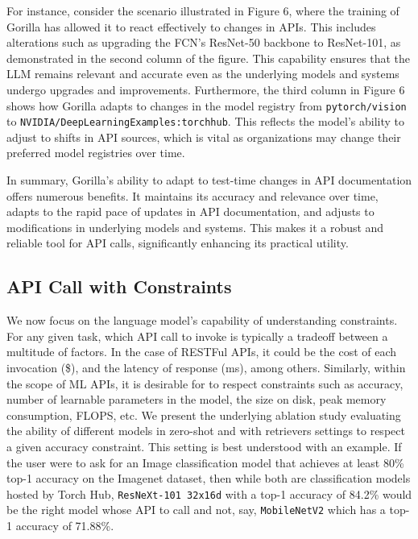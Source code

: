For instance, consider the scenario illustrated in Figure 6, where the training of Gorilla has allowed it to react effectively to changes in APIs. This includes alterations such as upgrading the FCN's ResNet-50 backbone to ResNet-101, as demonstrated in the second column of the figure. This capability ensures that the LLM remains relevant and accurate even as the underlying models and systems undergo upgrades and improvements.
Furthermore, the third column in Figure 6 shows how Gorilla adapts to changes in the model registry from \texttt{pytorch/vision} to \texttt{NVIDIA/DeepLearningExamples:torchhub}. This reflects the model's ability to adjust to shifts in API sources, which is vital as organizations may change their preferred model registries over time.

In summary, Gorilla's ability to adapt to test-time changes in API documentation offers numerous benefits. It maintains its accuracy and relevance over time, adapts to the rapid pace of updates in API documentation, and adjusts to modifications in underlying models and systems. This makes it a robust and reliable tool for API calls, significantly enhancing its practical utility.



\subsection{API Call with Constraints}
We now focus on the language model's capability of understanding constraints. For any given task, which API call to invoke is typically a tradeoff between a multitude of factors. In the case of RESTFul APIs, it could be the cost of each invocation (\$), and the latency of response (ms), among others. Similarly, within the scope of ML APIs, it is desirable for \gorilla{} to respect constraints such as accuracy, number of learnable parameters in the model, the size on disk, peak memory consumption, FLOPS, etc. We present the underlying ablation study evaluating the ability of different models in zero-shot and with retrievers settings to respect a given accuracy constraint. This setting is best understood with an example. If the user were to ask for an Image classification model that achieves at least 80\% top-1 accuracy on the Imagenet dataset, then while both are classification models hosted by Torch Hub,    \texttt{ResNeXt-101 32x16d} with a top-1 accuracy of 84.2\% would be the right model whose API to call and not, say, \texttt{MobileNetV2} which has a top-1 accuracy of 71.88\%. 

